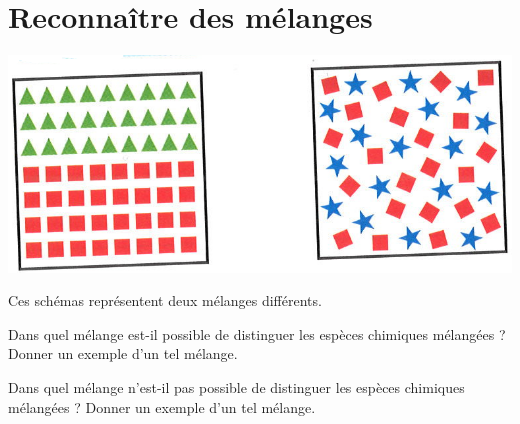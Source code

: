\section{Reconnaître des mélanges }\label{ex:melanges}

\begin{center}
	\includegraphics[scale=0.4]{img/melanges}
\end{center}

Ces schémas représentent deux mélanges différents.

\begin{questions}
	\question[] Dans quel mélange est-il possible de distinguer les espèces chimiques mélangées ? Donner un exemple d'un tel mélange.
	
	\question[] Dans quel mélange n'est-il pas possible de distinguer les espèces chimiques mélangées ? Donner un exemple d'un tel mélange.
\end{questions}
